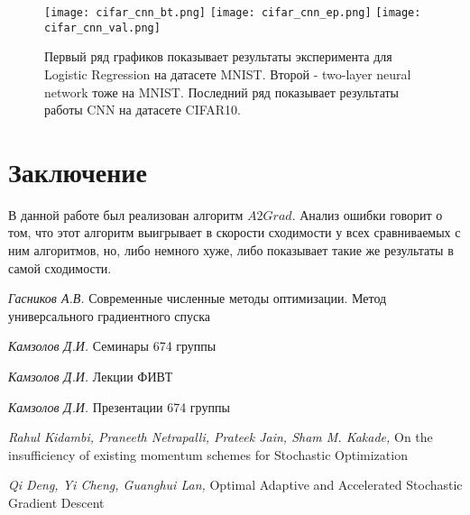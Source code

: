 \documentclass[a4paper,12pt]{article}
\theoremstyle{plain} %
\theoremstyle{definition} %
\theoremstyle{remark} %
\theoremstyle{definition}
\theoremstyle{definition}
\begin{document}
	\begin{figure}[!htb]
		\texttt{[image: cifar\_cnn\_bt.png]}
		\endminipage\hfill
		\texttt{[image: cifar\_cnn\_ep.png]}
		\endminipage\hfill
		\texttt{[image: cifar\_cnn\_val.png]}
		\endminipage
		\caption{Первый ряд графиков показывает результаты эксперимента для Logistic Regression на датасете MNIST. Второй - two-layer neural network тоже на MNIST. Последний ряд показывает результаты работы CNN на датасете CIFAR10.}
	\end{figure}
	
	
	
	\section{Заключение}
	В данной работе был реализован алгоритм $A2Grad$. Анализ ошибки говорит о том, что этот алгоритм выигрывает в скорости сходимости у всех сравниваемых с ним алгоритмов, но, либо немного хуже, либо показывает такие же результаты в самой сходимости.
	
	\newpage
	
	\begin{thebibliography}{4} 
		 \textit{Гасников А.В.} Современные численные методы оптимизации. Метод универсального градиентного спуска
		
		 \textit{Камзолов Д.И.} Семинары 674 группы 
		
		 \textit{Камзолов Д.И.} Лекции ФИВТ
		
		 \textit{Камзолов Д.И.} Презентации 674 группы
		
		 \textit{Rahul Kidambi, Praneeth Netrapalli, Prateek Jain, Sham M. Kakade,} On the insufficiency of existing momentum schemes for Stochastic Optimization
		
		 \textit{Qi Deng, Yi Cheng, Guanghui Lan,} Optimal Adaptive and Accelerated Stochastic Gradient Descent
		
	\end{thebibliography}
	
	
\end{document}
